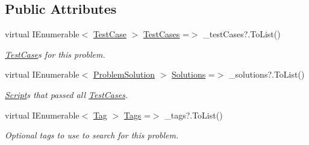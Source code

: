 \subsection*{Public Attributes}
\begin{DoxyCompactItemize}
\item 
virtual I\+Enumerable$<$ \mbox{\hyperlink{class_code_a_friend_1_1_data_model_1_1_test_case}{Test\+Case}} $>$ \mbox{\hyperlink{class_code_a_friend_1_1_data_model_1_1_problem_af4a665cdf0e4349c57e8588e95ad9717}{Test\+Cases}} =$>$ \+\_\+test\+Cases?.To\+List()
\begin{DoxyCompactList}\small\item\em \mbox{\hyperlink{class_code_a_friend_1_1_data_model_1_1_test_case}{Test\+Case}}s for this problem.\end{DoxyCompactList}\item 
virtual I\+Enumerable$<$ \mbox{\hyperlink{class_code_a_friend_1_1_data_model_1_1_problem_solution}{Problem\+Solution}} $>$ \mbox{\hyperlink{class_code_a_friend_1_1_data_model_1_1_problem_a3bebdf4e45042e9476fd7ae7cf38738b}{Solutions}} =$>$ \+\_\+solutions?.To\+List()
\begin{DoxyCompactList}\small\item\em \mbox{\hyperlink{class_code_a_friend_1_1_data_model_1_1_script}{Script}}s that passed all \mbox{\hyperlink{class_code_a_friend_1_1_data_model_1_1_problem_af4a665cdf0e4349c57e8588e95ad9717}{Test\+Cases}}.\end{DoxyCompactList}\item 
virtual I\+Enumerable$<$ \mbox{\hyperlink{class_code_a_friend_1_1_data_model_1_1_tag}{Tag}} $>$ \mbox{\hyperlink{class_code_a_friend_1_1_data_model_1_1_problem_ad5c3e1b321171d7c7723df70e99cf88d}{Tags}} =$>$ \+\_\+tags?.To\+List()
\begin{DoxyCompactList}\small\item\em Optional tags to use to search for this problem.\end{DoxyCompactList}\end{DoxyCompactItemize}
